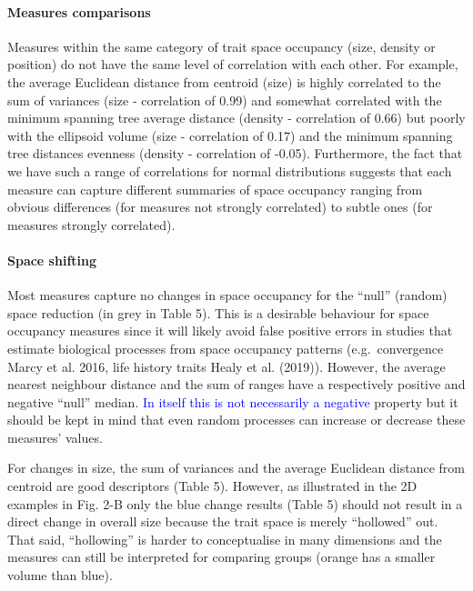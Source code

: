 \documentclass[]{article}
\let\oldparagraph\paragraph
\renewcommand{\paragraph}[1]{\oldparagraph{#1}\mbox{}}
\begin{document}
\paragraph{Measures comparisons}\label{measures-comparisons}

Measures within the same category of trait space occupancy (size,
density or position) do not have the same level of correlation with each
other. For example, the average Euclidean distance from centroid (size)
is highly correlated to the sum of variances (size - correlation of
0.99) and somewhat correlated with the minimum spanning tree average
distance (density - correlation of 0.66) but poorly with the ellipsoid
volume (size - correlation of 0.17) and the minimum spanning tree
distances evenness (density - correlation of -0.05). Furthermore, the
fact that we have such a range of correlations for normal distributions
suggests that each measure can capture different summaries of space
occupancy ranging from obvious differences (for measures not strongly
correlated) to subtle ones (for measures strongly correlated).

\paragraph{Space shifting}\label{space-shifting-1}

Most measures capture no changes in space occupancy for the ``null''
(random) space reduction (in grey in Table 5). This is a desirable
behaviour for space occupancy measures since it will likely avoid false
positive errors in studies that estimate biological processes from space
occupancy patterns (e.g.~convergence Marcy et al. 2016, life history
traits Healy et al. (2019)). However, the average nearest neighbour
distance and the sum of ranges have a respectively positive and negative
``null'' median. \textcolor{blue}{In itself this is
not necessarily a negative} property but it should be kept in mind that
even random processes can increase or decrease these measures' values.

For changes in size, the sum of variances and the average Euclidean
distance from centroid are good descriptors (Table 5). However, as
illustrated in the 2D examples in Fig. 2-B only the blue change results
(Table 5) should not result in a direct change in overall size because
the trait space is merely ``hollowed'' out. That said, ``hollowing'' is
harder to conceptualise in many dimensions and the measures can still be
interpreted for comparing groups (orange has a smaller volume than
blue).
\end{document}
